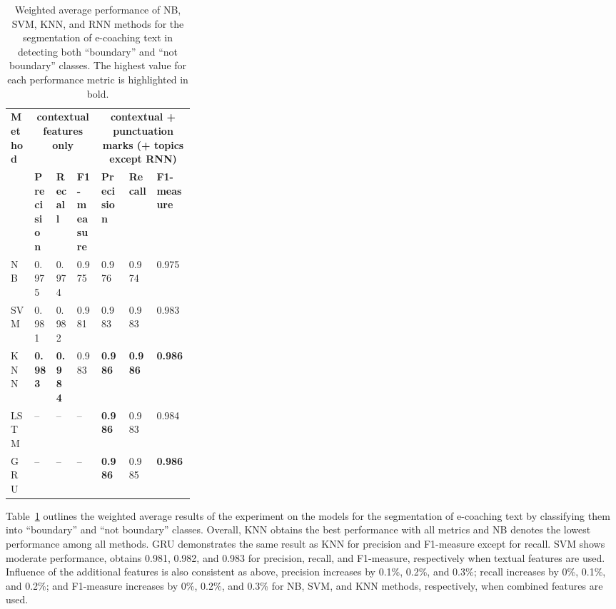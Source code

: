 \documentclass{amia}
\begin{document}
\begin{table}[ht]
\centering
\caption{Weighted average performance of NB, SVM, KNN, and RNN methods for the segmentation of e-coaching text in detecting both ``boundary'' and ``not boundary'' classes. The highest value for each performance metric is highlighted in bold.}
\label{tab:result_weighted_avg}
  \begin{tabular}{|l|l|l|l|p{0.15\linewidth}|p{0.15\linewidth}|l|}
  \hline
   \multirow{2}{*}{\textbf{Method}} & \multicolumn{3}{|c|}{\textbf{contextual features only}} & \multicolumn{3}{|c|}{\textbf{contextual + punctuation marks (+ topics except RNN)}} \\\cline{2-7}
   & \textbf{Precision}  & \textbf{Recall} & \textbf{F1-measure} & \textbf{Precision}  & \textbf{Recall} & \textbf{F1-measure}\\ \hline    
    
 NB & 0.975 & 0.974 & 0.975 & 0.976 & 0.974 & 0.975 \\ \hline
 SVM & 0.981 & 0.982 & 0.981 & 0.983 & 0.983 & 0.983\\ \hline
 KNN & \textbf{0.983} & \textbf{0.984} & 0.983 & \textbf{0.986} & \textbf{0.986} & \textbf{0.986}\\ \hline
 LSTM & -- & -- & -- & \textbf{0.986} & 0.983 & 0.984 \\ \hline
 GRU & -- & -- & -- & \textbf{0.986} & 0.985 & \textbf{0.986} \\ \hline 
  \end{tabular}
\end{table} 

Table~\ref{tab:result_weighted_avg} outlines the weighted average results of the experiment on the models for the segmentation of e-coaching text by classifying them into ``boundary'' and ``not boundary'' classes. Overall, KNN obtains the best performance with all metrics and NB denotes the lowest performance among all methods. GRU demonstrates the same result as KNN for precision and F1-measure except for recall. SVM shows moderate performance, obtains 0.981, 0.982, and 0.983 for precision, recall, and F1-measure, respectively when textual features are used. Influence of the additional features is also consistent as above, precision increases by 0.1\%, 0.2\%, and 0.3\%; recall increases by 0\%, 0.1\%, and 0.2\%; and F1-measure increases by 0\%, 0.2\%, and 0.3\% for NB, SVM, and KNN methods, respectively, when combined features are used.\\
\end{document}
